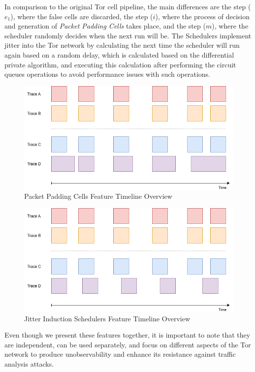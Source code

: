 In comparison to the original Tor cell pipeline, the main differences are the step (\(e_1\)), where the false cells are discarded, the step (\(i\)), where the process of decision and generation of \textit{Packet Padding Cells} takes place, and the step (\(m\)), where the scheduler randomly decides when the next run will be. The Schedulers implement jitter into the Tor network by calculating the next time the scheduler will run again based on a random delay, which is calculated based on the differential private algorithm, and executing this calculation after performing the circuit queues operations to avoid performance issues with such operations.
\begin{figure}[!h]
  \centering
  \includegraphics[width=\textwidth]{Chapters/Figures/PPC_Timeline.png}
  \caption{Packet Padding Cells Feature Timeline Overview}\label{fig:ppc_timeline}
\end{figure}

\begin{figure}[!h]
  \centering
  \includegraphics[width=\textwidth]{Chapters/Figures/JIS_Timeline.png}
  \caption{Jitter Induction Schedulers Feature Timeline Overview}\label{fig:jis_timeline}
\end{figure}

Even though we present these features together, it is important to note that they are independent, can be used separately, and focus on different aspects of the Tor network to produce unobservability and enhance its resistance against traffic analysis attacks. 

